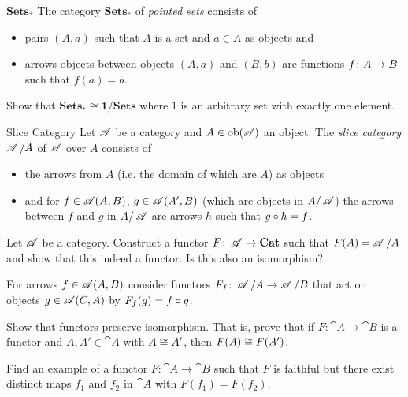 \begin{definition}{$\mathbf{Sets_*}$}
  The category $\mathbf{Sets_*}$ of \emph{pointed sets} consists of
  \begin{itemize}
  \item pairs $(A,a)$ such that $A$ is a set and $a\in A$ as objects and
  \item arrows objects between objects $(A,a)$ and $(B,b)$ are functions $f\from A\to B$ such that $f(a)=b$.
  \end{itemize}
\end{definition}

\begin{exercise}
Show that $\mathbf{Sets_*\cong 1/\mathbf{Sets}}$ where $1$ is an arbitrary set with exactly one element.  
\end{exercise}

\begin{definition}{Slice Category}
  Let $\operatorname{\mathscr A}$ be a category and $A\in\operatorname{ob}(\operatorname{\mathscr A})$ an object. The \emph{slice category} $\operatorname{\mathscr A}/A$ of $\operatorname{\mathscr A}$ over $A$ consists of
  \begin{itemize}
  \item the arrows from $A$ (i.e. the domain of which are $A$) as objects
  \item and for $f\in \operatorname{\mathscr A}(A,B)$, $g\in\operatorname{\mathscr A}(A',B)$ (which are objects in $A/\operatorname{\mathscr A}$) the arrows between $f$ and $g$ in $A/\operatorname{\mathscr A}$ are arrows $h$ such that $g\mathbin{\circ} h=f$.
  \end{itemize}
\end{definition}

\begin{exercise}
  Let $\operatorname{\mathscr A}$ be a category. Construct a functor $F\from \A\to\mathbf{Cat}$ such that $F(A)=\operatorname{\mathscr A}/A$ and show that this indeed a functor. Is this also an isomorphism?

  \begin{hint}
    For arrows $f\in\operatorname{\mathscr A}(A,B)$ consider functors $F_f\from\A/A\to\A/B$ that act on objects $g\in \operatorname{\mathscr A}(C,A)$ by $F_f(g)=f\mathbin{\circ} g$. 
  \end{hint}
\end{exercise}

\begin{exercise}
Show that functors preserve isomorphism. That is, prove that if $F : \cat{A} \to \cat{B}$ is a functor and $A, A' \in \cat{A}$ with $A \cong A'$, then $F(A) \cong F(A')$.
\end{exercise}

\begin{exercise}
  Find an example of a functor $F : \cat{A} \to \cat{B}$ such that $F$ is faithful but there exist distinct maps $f_1$ and $f_2$ in $\cat{A}$ with $F(f_1) = F(f_2)$.
\end{exercise}

